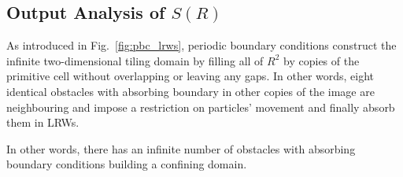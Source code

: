 

\subsection{Output Analysis of $S(R)$}


As introduced in Fig.~\ref{fig:pbc_lrws}, periodic boundary conditions
construct the infinite two-dimensional tiling domain by filling all of
$R^2$ by copies of the primitive cell without overlapping or leaving
any gaps. In other words, eight identical obstacles with absorbing
boundary in other copies of the image are neighbouring and impose a
restriction on particles' movement and finally absorb them in LRWs.


In other words, there has an infinite number of obstacles
with absorbing boundary conditions building a confining domain.
          
